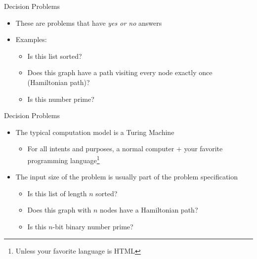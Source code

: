 \documentclass[aspectratio=169]{beamer}
\begin{document}
\begin{frame}{Decision Problems}
   \begin{itemize}
       \item These are problems that have \emph{yes or no} answers \pause
       \item Examples:
       \begin{itemize}
           \item Is this list sorted?
           \item Does this graph have a path visiting every node exactly once (Hamiltonian path)?
           \item Is this number prime?
       \end{itemize}
   \end{itemize} 
\end{frame}

\begin{frame}{Decision Problems}
    \begin{itemize}
        \item The typical computation model is a Turing Machine
        \begin{itemize}
            \item For all intents and purposes, a normal computer $+$ your favorite programming language\footnote{Unless your favorite language is HTML}
        \end{itemize} \pause
        \item The input size of the problem is usually part of the problem specification 
         \begin{itemize}
           \item Is this list of length $n$ sorted?
           \item Does this graph with $n$ nodes have a Hamiltonian path?
           \item Is this $n$-bit binary number prime?
       \end{itemize} 
    \end{itemize}
\end{frame}
\end{document}
